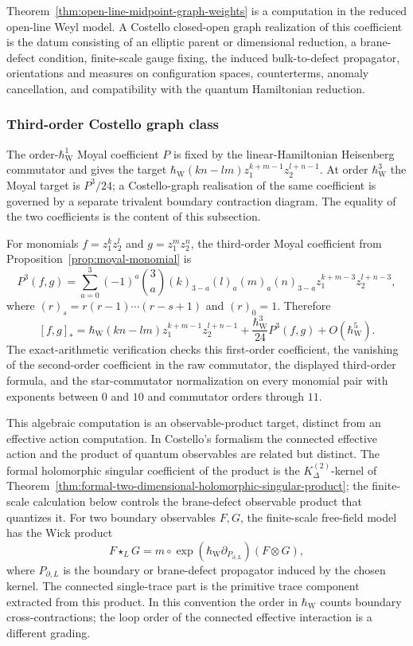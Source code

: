 \documentclass[11pt]{memoir}
\begin{document}
\begin{rmk}
  Theorem~\ref{thm:open-line-midpoint-graph-weights} is a computation in
  the reduced open-line Weyl model.  A Costello closed-open graph
  realization of this coefficient is the datum consisting of an elliptic parent
  or dimensional reduction, a brane-defect condition, finite-scale gauge fixing, the induced
  bulk-to-defect propagator, orientations and measures on configuration spaces,
  counterterms, anomaly cancellation, and compatibility with the quantum
  Hamiltonian reduction.
\end{rmk}

\subsubsection{Third-order Costello graph class}

The order-\(\hbar_{\mathrm{W}}^1\) Moyal coefficient \(P\) is fixed by the
linear-Hamiltonian Heisenberg commutator and gives the target
\(\hbar_{\mathrm{W}}(kn-lm)z_1^{k+m-1}z_2^{l+n-1}\).  At order \(\hbar_{\mathrm{W}}^3\) the
Moyal target is \(P^3/24\); a Costello-graph realisation of the same
coefficient is governed by a separate trivalent boundary contraction
diagram.  The equality of the two coefficients is the
content of this subsection.

For monomials $f=z_1^kz_2^l$ and $g=z_1^mz_2^n$, the third-order Moyal
coefficient from Proposition~\ref{prop:moyal-monomial} is
$$P^3(f,g)=
  \sum_{a=0}^3(-1)^a\binom{3}{a}
  (k)_{3-a}(l)_a(m)_a(n)_{3-a}
  z_1^{k+m-3}z_2^{l+n-3},$$
where $(r)_s=r(r-1)\cdots(r-s+1)$ and $(r)_0=1$. Therefore
$$[f,g]_*=\hbar_{\mathrm{W}}(kn-lm)z_1^{k+m-1}z_2^{l+n-1}
  +\frac{\hbar_{\mathrm{W}}^3}{24}P^3(f,g)+O(\hbar_{\mathrm{W}}^5).$$
The exact-arithmetic verification checks this first-order coefficient, the
vanishing of the second-order coefficient in the raw commutator, the displayed
third-order formula, and the star-commutator normalization on every monomial
pair with exponents between \(0\) and \(10\) and commutator orders through
\(11\).

This algebraic computation is an observable-product target, distinct from an
effective action computation. In Costello's formalism the connected effective action and
the product of quantum observables are related but distinct.  The
formal holomorphic singular coefficient of the product is the
\(K^{(2)}_\Delta\)-kernel of
Theorem~\ref{thm:formal-two-dimensional-holomorphic-singular-product}; the finite-scale
calculation below controls the brane-defect observable product that
quantizes it.  For two
boundary observables $F,G$, the finite-scale free-field model has the Wick
product
$$F\star_L G=m\circ\exp(\hbar_{\mathrm{W}}\partial_{P_{\partial,L}})(F\otimes G),$$
where $P_{\partial,L}$ is the boundary or brane-defect propagator induced by the
chosen kernel. The connected single-trace part is the primitive trace
component extracted from this product. In this convention the order in \(\hbar_{\mathrm{W}}\)
counts boundary cross-contractions; the loop order of the connected effective
interaction is a different grading.
\end{document}
